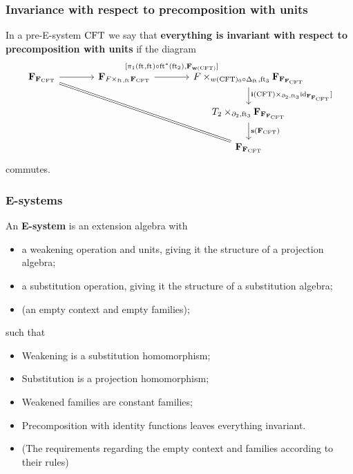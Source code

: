 \documentclass{beamer}
\newcommand\important[1]{\textbf{\color{red!90!black}#1}}
\begin{document}
\begin{frame}
\frametitle{\bf Invariance with respect to precomposition with units}
In a pre-E-system $\mathrm{CFT}$ we say that \important{everything is invariant
with respect to precomposition with units} if the diagram
\begin{equation*}
\begin{tikzcd}[ampersand replacement=\&,column sep=large]
\famesys{\famesys{\stesys}}
  \ar{r}
  \ar[equals]{ddrr}
  \&
\famesys{\cobesys{\stesysf}{\famesys{\stesys}}{\eft}{\eft}}
  \ar{r}[yshift=1ex]{[\pullbackpr{1}{\eft}{\eft}\circ\eft^\ast(\eft[2]),\famehom{\mathbf{w}(\stesys)}]}
  \&
\cobesys
  {\stesysf}
  {\famesys{\famesys{\famesys{\stesys}}}}
  {w(\stesys)_0\circ\Delta_{\eft}}
  {\eft[3]}
  \ar{d}{\pullback{\mathbf{i}(\stesys)}{\catid{\famesys{\famesys{\stesys}}}]}{\ebd[2]}{\eft[3]}}
  \\
  {}\&
  {}\&
\cobesys{\stesyst_2}{\famesys{\famesys{\famesys{\stesys}}}}{\ebd[2]}{\eft[3]}
  \ar{d}{\mathbf{s}(\famesys{\stesys})}
  \\
  {}\&
  {}\&
\famesys{\famesys{\stesys}}
\end{tikzcd}
\end{equation*}
commutes.
\end{frame}

\begin{frame}
\frametitle{\bf E-systems}
An \important{E-system} is an extension algebra with\pause
\begin{itemize}
\item a weakening operation and units, giving it the structure of a projection algebra;\pause
\item a substitution operation, giving it the structure of a substitution algebra;\pause
\item (an empty context and empty families);
\end{itemize}
such that\pause
\begin{itemize}
\item Weakening is a substitution homomorphism;\pause
\item Substitution is a projection homomorphism;\pause
\item Weakened families are constant families;\pause
\item Precomposition with identity functions leaves everything invariant.\pause
\item (The requirements regarding the empty context and families according to their rules)
\end{itemize}
\end{frame}
\end{document}
